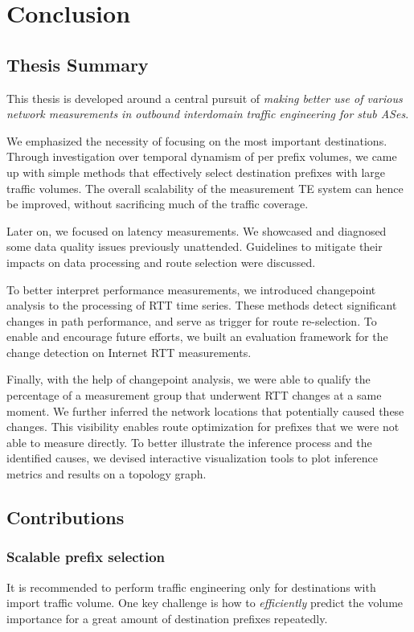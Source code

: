 \chapter{Conclusion}

\section{Thesis Summary}

This thesis is developed around a central pursuit of \textit{making better use of various network measurements in outbound interdomain traffic engineering for stub ASes}.

We emphasized the necessity of focusing on the most important destinations.
Through investigation over temporal dynamism of per prefix volumes,
we came up with simple methods that effectively select destination prefixes with large traffic volumes.
The overall scalability of the measurement TE system can hence be improved, without sacrificing much of the traffic coverage.

Later on, we focused on latency measurements. 
We showcased and diagnosed some data quality issues previously unattended.
Guidelines to mitigate their impacts on data processing and route selection were discussed.

To better interpret performance measurements, we introduced changepoint analysis to the processing of RTT time series.
These methods detect significant changes in path performance, and serve as trigger for route re-selection.
To enable and encourage future efforts, we built an evaluation framework for the change detection on Internet RTT measurements.

Finally, with the help of changepoint analysis, we were able to qualify the percentage of a measurement group that underwent RTT changes at a same moment.
We further inferred the network locations that potentially caused these changes. 
This visibility enables route optimization for prefixes that we were not able to measure directly.
To better illustrate the inference process and the identified causes, we devised interactive visualization tools to plot inference metrics and results on a topology graph.

\section{Contributions}

\subsection{Scalable prefix selection}
It is recommended to perform traffic engineering only for destinations with import traffic volume. One key challenge is how to \textit{efficiently} predict the volume importance for a great amount of destination prefixes repeatedly.

